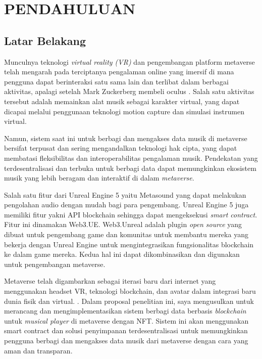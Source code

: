 \chapter{PENDAHULUAN}

\section{Latar Belakang}

Munculnya teknologi \emph{virtual reality (VR)} dan pengembangan platform metaverse telah mengarah pada terciptanya
pengalaman online yang imersif di mana pengguna dapat berinteraksi satu sama lain dan terlibat dalam berbagai aktivitas, apalagi setelah  Mark Zuckerberg
membeli oculus \parencite{luckerson2014facebook}.
Salah satu aktivitas tersebut adalah memainkan alat musik sebagai karakter virtual, yang dapat dicapai melalui penggunaan
teknologi motion capture dan simulasi instrumen virtual.

Namun, sistem saat ini untuk berbagi dan mengakses data musik di metaverse bersifat terpusat dan sering mengandalkan teknologi
hak cipta, yang dapat membatasi fleksibilitas dan interoperabilitas pengalaman musik. Pendekatan yang terdesentralisasi dan terbuka
untuk berbagi data dapat memungkinkan ekosistem musik yang lebih beragam dan interaktif di dalam \emph{metaverse}.

Salah satu fitur dari Unreal Engine 5 yaitu Metasound yang dapat melakukan pengolahan audio dengan mudah bagi para pengembang. Unreal Engine 5 juga
memiliki fitur yakni API blockchain sehingga dapat mengeksekusi \emph{smart contract}. Fitur ini dinamakan Web3.UE. Web3.Unreal adalah plugin
\emph{open source} yang dibuat untuk pengembang game dan komunitas untuk membantu mereka yang bekerja dengan Unreal Engine untuk mengintegrasikan
fungsionalitas blockchain ke dalam game mereka. Kedua hal ini dapat dikombinasikan dan digunakan untuk
pengembangan metaverse.

Metaverse telah digambarkan sebagai iterasi baru dari internet yang menggunakan headset VR, teknologi blockchain,
dan avatar dalam integrasi baru dunia fisik dan virtual. \parencite{DWIVEDI2022102542}. Dalam proposal penelitian ini, saya mengusulkan
untuk merancang dan mengimplementasikan sistem berbagi data berbasis \emph{blockchain}
untuk \emph{musical player} di metaverse dengan NFT. Sistem ini akan menggunakan smart contract dan solusi penyimpanan terdesentralisasi
untuk memungkinkan pengguna berbagi dan mengakses data musik dari metaverse dengan cara yang aman dan transparan.

